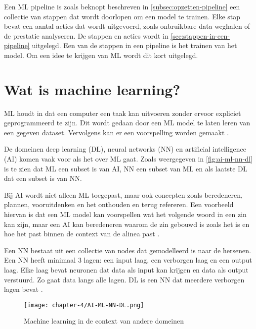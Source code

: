
Een ML pipeline is zoals beknopt beschreven in \autoref{subsec:opzetten-pipeline} een collectie van stappen dat wordt doorlopen om een model te trainen. Elke stap bevat een aantal acties dat wordt uitgevoerd, zoals onbruikbare data weghalen of de prestatie analyseren. De stappen en acties wordt in \autoref{sec:stappen-in-een-pipeline} uitgelegd. Een van de stappen in een pipeline is het trainen van het model. Om een idee te krijgen van ML wordt dit kort uitgelegd.

\section{Wat is machine learning?}\label{sec:wat-is-machine-learning}
ML houdt in dat een computer een taak kan uitvoeren zonder ervoor expliciet geprogrammeerd te zijn. Dit wordt gedaan door een ML model te laten leren van een gegeven dataset. Vervolgens kan er een voorspelling worden gemaakt \cite[p.~1-3]{introduction-to-machine-learning}.

De domeinen deep learning (DL), neural networks (NN) en artificial intelligence (AI) komen vaak voor als het over ML gaat. Zoals weergegeven in \autoref{fig:ai-ml-nn-dl} is te zien dat ML een subset is van AI, NN een subset van ML en als laatste DL dat een subset is van NN.

Bij AI wordt niet alleen ML toegepast, maar ook concepten zoals beredeneren, plannen, vooruitdenken en het onthouden en terug refereren. Een voorbeeld hiervan is dat een ML model kan voorspellen wat het volgende woord in een zin kan zijn, maar een AI kan beredeneren waarom de zin gebouwd is zoals het is en hoe het past binnen de context van de alinea past \cite{ml-think-about-ml-brownlee}.

Een NN bestaat uit een collectie van nodes dat gemodelleerd is naar de hersenen. Een NN heeft minimaal 3 lagen: een input laag, een verborgen laag en een output laag. Elke laag bevat neuronen dat data als input kan krijgen en data als output verstuurd. Zo gaat data langs alle lagen. DL is een NN dat meerdere verborgen lagen bevat \cite{ml-neural-network-nicholson}.

\begin{figure}[hbt!]
  \centering
  \texttt{[image: chapter-4/AI-ML-NN-DL.png]}
  \caption{Machine learning in de context van andere domeinen}
  \label{fig:ai-ml-nn-dl}
\end{figure}

